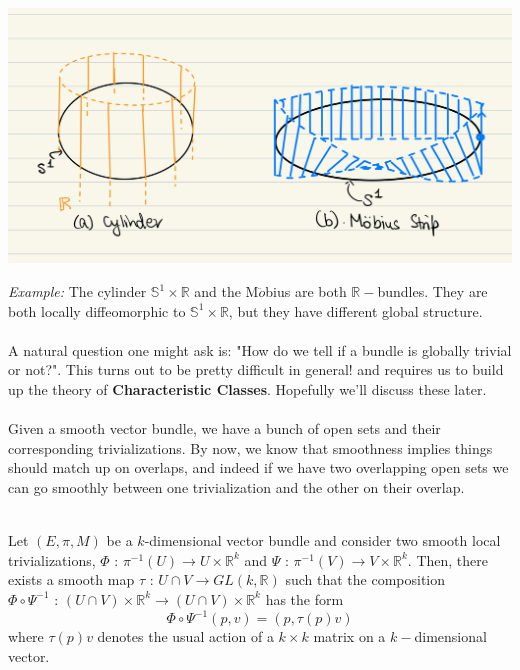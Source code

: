 \documentclass[11pt]{article}
\begin{document}
\begin{center}
    \includegraphics*[scale=0.15]{pictures/Cylinder_and_Mobius_strip.png}
\end{center}
\textit{Example:} The cylinder $\mathbb{S}^1 \times \mathbb{R}$ and the M$\ddot{o}$bius are both $\mathbb{R}-$bundles. They are both locally diffeomorphic to $\mathbb{S}^1 \times \mathbb{R}$, but they have different global structure.
\\
\\
A natural question one might ask is: "How do we tell if a bundle is globally trivial or not?". This turns out to be pretty difficult in general! and requires us to build up the theory of \textbf{Characteristic Classes}. Hopefully we'll discuss these later.
\\
\\
Given a smooth vector bundle, we have a bunch of open sets and their corresponding trivializations. By now, we know that smoothness implies things should match up on overlaps, and indeed if we have two overlapping open sets we can go smoothly between one trivialization and the other on their overlap.
\\
\\
\begin{lemma}
    Let $(E, \pi, M)$ be a $k$-dimensional vector bundle and consider two smooth local trivializations, $\Phi \text{ : } \pi^{-1}(U) \rightarrow U \times \mathbb{R}^{k}$ and  $\Psi \text{ : } \pi^{-1}(V) \rightarrow V \times \mathbb{R}^k $. Then, there exists a smooth map $\tau \text{ : } U \cap V \rightarrow GL(k, \mathbb{R})$ such that the composition $\Phi \circ \Psi^{-1} \text{ : } (U \cap V) \times \mathbb{R}^k \rightarrow (U \cap V) \times \mathbb{R}^k $ has the form 
    \[  \Phi \circ \Psi^{-1}(p, v) = (p, \tau(p) v)   \]
    where $\tau(p) v$ denotes the usual action of a $k \times k$ matrix on a $k-$dimensional vector.
\end{lemma}
\end{document}
